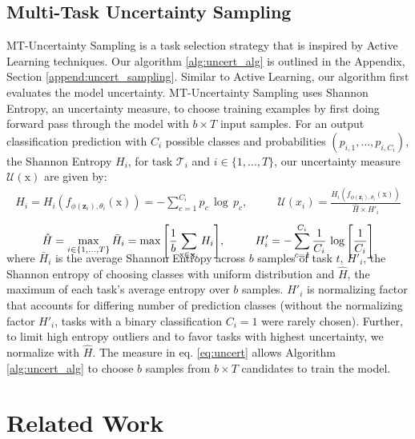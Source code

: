 \documentclass{article} \usepackage{iclr2021_conference,times}
\begin{document}
\subsection{Multi-Task Uncertainty Sampling}
\label{sec:uncert_samp}
MT-Uncertainty Sampling is a task selection strategy that is inspired by Active Learning techniques. Our algorithm \ref{alg:uncert_alg} is outlined in the Appendix, Section \ref{append:uncert_sampling}. Similar to Active Learning, our algorithm first evaluates the model uncertainty. MT-Uncertainty Sampling uses Shannon Entropy, an uncertainty measure, to choose training examples by first doing forward pass 
through the model with $b\times T$ input samples. For an output classification prediction with $C_i$ possible classes and probabilities $(p_{i,1}, \dotsc , p_{i,C_i})$, the Shannon Entropy $H_i$, for task $\mathscr{T}_i$ and $i \in \{1,\dotsc,T\}$, our uncertainty measure $\mathscr{U}(\text{x})$ are given by:
\begin{gather}
    H_i = H_i(f_{\phi(\textbf{z}_i),\theta_i}(\text{x})) = -\sum_{c=1}^{C_i} p_c\,\log\,p_c,
    \:\:\:\:\:\: \:\:\:\:\:\:\mathscr{U}(x_i) = \frac{H_i(f_{\phi(\textbf{z}_i),\theta_i}(\text{x}))}{\hat{H} \times H'_i}
    \label{eq:uncert}
\end{gather}
\begin{gather}
\vspace{-.5cm}
\hat{H} = \max_{i \in \{1,\dotsc,T\}} \bar{H}_i = \max \Bigg[\frac{1}{b} \sum_{\text{x} \in \textbf{x}_i} H_i \Bigg], \:\:\:\:\:\: \:\:\:\:\:\: H'_i = -\sum_{c=1}^{C_i} \frac{1}{C_i}\,\log \Bigg[\frac{1}{C_i}\Bigg]
\label{eq:norm_uni}
\end{gather}
where $\bar{H}_i$ is the average Shannon Entropy across $b$ samples of task $t$, $H'_i$, the Shannon entropy of choosing classes with uniform distribution and $\hat{H}$, the maximum of each task's average entropy over $b$ samples. $H'_i$ is normalizing factor that accounts for differing number of prediction classes (without the normalizing factor $H'_i$, tasks with a binary classification $C_i=1$ were rarely chosen). Further, to limit high entropy outliers and to favor tasks with highest uncertainty, we normalize with $\hat{H}$. The measure in eq. \ref{eq:uncert} allows Algorithm \ref{alg:uncert_alg} to choose $b$ samples from $b\times T$ candidates to train the model.


\vspace{-10pt}
\section{Related Work}
\vspace{-5pt}
\end{document}
